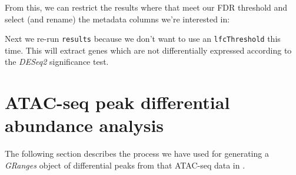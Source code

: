 \documentclass[
  9pt,
  a4paper,
]{extarticle}
\newenvironment{Shaded}{\begin{snugshade}}{\end{snugshade}}
\newcommand{\DataTypeTok}[1]{\textcolor[rgb]{0.13,0.29,0.53}{#1}}
\newcommand{\FloatTok}[1]{\textcolor[rgb]{0.00,0.00,0.81}{#1}}
\newcommand{\KeywordTok}[1]{\textcolor[rgb]{0.13,0.29,0.53}{\textbf{#1}}}
\newcommand{\NormalTok}[1]{#1}
\newcommand{\OperatorTok}[1]{\textcolor[rgb]{0.81,0.36,0.00}{\textbf{#1}}}
\newcommand{\StringTok}[1]{\textcolor[rgb]{0.31,0.60,0.02}{#1}}
\begin{document}
From this, we can restrict the results where that meet our FDR threshold and
select (and rename) the metadata columns we're interested in:

\begin{Shaded}
\end{Shaded}

Next we re-run \texttt{results} because we don't want to use an \texttt{lfcThreshold} this
time. This will extract genes which are not differentially expressed according
to the \emph{DESeq2} significance test.

\begin{Shaded}
\end{Shaded}

\hypertarget{atac}{%
\section{ATAC-seq peak differential abundance analysis}\label{atac}}

The following section describes the process we have used for generating a
\emph{GRanges} object of differential peaks from that ATAC-seq data in \citet{alasoo}.
\end{document}
